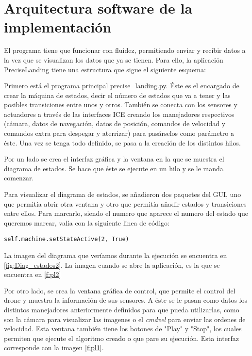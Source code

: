\section{Arquitectura software de la implementaci\'on}

\hspace{1 cm} El programa tiene que funcionar con fluidez, permitiendo enviar y recibir datos a la vez que se visualizan los datos que ya se tienen. Para ello, la aplicaci\'on PreciseLanding tiene una estructura que sigue el siguiente esquema:

\hspace{1 cm} Primero est\'a el programa principal precise\_landing.py. \'Este es el encargado de crear la m\'aquina de estados, decir el n\'umero de estados que va a tener y las posibles transiciones entre unos y otros. Tambi\'en se conecta con los sensores y actuadores a trav\'es de las interfaces ICE creando los manejadores respectivos (c\'amara, datos de navegaci\'on, datos de posici\'on, comandos de velocidad y comandos extra para despegar y aterrizar) para pas\'arselos como par\'ametro a \'este. Una vez se tenga todo definido, se pasa a la creaci\'on de los distintos hilos.

\hspace{1 cm} Por un lado se crea el interfaz gr\'afica y la ventana en la que se muestra el diagrama de estados. Se hace que \'este se ejecute en un hilo y se le manda comenzar.

\hspace{1cm} Para visualizar el diagrama de estados, se añadieron dos paquetes del GUI, uno que permit\'ia abrir otra ventana y otro que permit\'ia añadir estados y transiciones entre ellos. Para marcarlo, siendo el numero que aparece el numero del estado que queremos marcar, val\'ia con la siguiente linea de c\'odigo:

\begin{lstlisting}[backgroundcolor=\color{yellow}]
self.machine.setStateActive(2, True)
\end{lstlisting}
	
\hspace{1cm}La imagen del diagrama que ver\'iamos durante la ejecuci\'on se encuentra en \ref{fig:Diag_estados2}. La imagen cuando se abre la aplicaci\'on, es la que se encuentra en \ref{f:pl2}

\hspace{1 cm} Por otro lado, se crea la ventana gr\'afica de control, que permite el control del drone y muestra la informaci\'on de sus sensores. A \'este se le pasan como datos los distintos manejadores anteriormente definidos para que pueda utilizarlas, como son la c\'amara para visualizar las imagenes o el \textit{cmdvel} para enviar las ordenes de velocidad. Esta ventana tambi\'en tiene los botones de "Play" y "Stop", los cuales permiten que ejecute el algoritmo creado o que pare su ejecuci\'on. Esta interfaz corresponde con la imagen \ref{f:pl1}.


